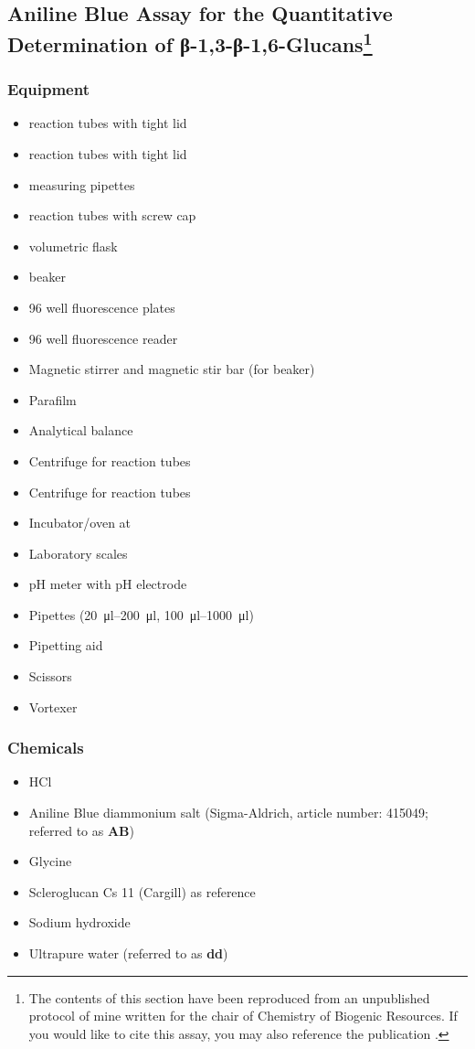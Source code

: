 \subsection[Aniline Blue Assay for the Quantitative Determination of β-1,3-β-1,6-Glucans]{Aniline Blue Assay for the Quantitative Determination of β-1,3-β-1,6-Glucans\label{supp-sirofluor}\footnote{The contents of this section have been reproduced from an unpublished protocol of mine written for the chair of Chemistry of Biogenic Resources. If you would like to cite this assay, you may also reference the publication \cite{Koenig2017}.}}
\subsubsection{Equipment}
\begin{itemize}
	\item {} reaction tubes with tight lid
	\item {} reaction tubes with tight lid
	\item {} measuring pipettes
	\item {} reaction tubes with screw cap
	\item {} volumetric flask
	\item {} beaker
	\item 96 well fluorescence plates
	\item 96 well fluorescence reader
	\item Magnetic stirrer and magnetic stir bar (for  beaker)
	\item Parafilm
	\item Analytical balance
	\item Centrifuge for  reaction tubes
	\item Centrifuge for  reaction tubes
	\item Incubator/oven at 
	\item Laboratory scales
	\item pH meter with pH electrode
	\item Pipettes (\SIrange{20}{200}{\micro\litre}, \SIrange{100}{1000}{\micro\litre})
	\item Pipetting aid
	\item Scissors
	\item Vortexer
\end{itemize}

\subsubsection{Chemicals}
\begin{itemize}
	\item {} HCl
	\item Aniline Blue diammonium salt (Sigma-Aldrich, article number: 415049; referred to as \textbf{AB})
	\item Glycine
	\item Scleroglucan Cs 11 (Cargill) as reference
	\item Sodium hydroxide
	\item Ultrapure water (referred to as \textbf{dd})
\end{itemize}

